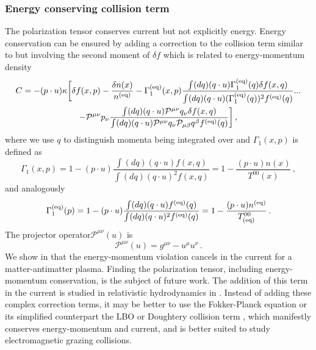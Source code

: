 \subsubsection{Energy conserving collision term}
The polarization tensor  conserves current but not explicitly energy. Energy conservation can be ensured by adding a correction to the collision term similar to  but involving the second moment of $\delta f$ which is related to energy-momentum density \cite{Rocha:2021zcw}
\begin{multline}
    C = - (p\cdot u) \kappa\bigg[\delta f(x,p) -\frac{\delta n(x) }{ n^{(\mathrm{eq})} } -\Gamma_1^{(\mathrm{eq})}(x,p)\frac{\int (dq) (q\cdot u)\Gamma_1^{(\mathrm{eq})}(q) \delta f(x,q) }{\int (dq) (q\cdot u) (\Gamma_1^{(\mathrm{eq})}(q))^2 f^{(\mathrm{eq})}(q) }...\\
    -\mathcal{P}^{\mu \nu}p_\nu\frac{\int (dq) (q\cdot u)\mathcal{P}^{\mu \nu}q_\nu \delta f(x,q) }{\int (dq) (q\cdot u) \mathcal{P}^{\mu \nu}q_\nu\mathcal{P}_{\mu \beta}q^\beta f^{(\mathrm{eq})}(q) }
    \bigg]\,,
\end{multline}
where we use $q$ to distinguish momenta being integrated over and $\Gamma_1(x,p)$ is defined as
\begin{equation}
    \Gamma_1(x,p) = 1-(p\cdot u)\frac{\int (dq) (q\cdot u)f(x,q)}{\int (dq) (q\cdot u)^2f(x,q)}
    = 1-\frac{ (p\cdot u) n(x)}{T^{00}(x)}\,,
\end{equation}
and analogously
\begin{equation}
    \Gamma_1^{(\mathrm{eq})}(p) = 1-(p\cdot u)\frac{\int (dq) (q\cdot u)f^{(\mathrm{eq})}(q)}{\int (dq) (q\cdot u)^2f^{(\mathrm{eq})}(q)}
    = 1-\frac{ (p\cdot u) n^{(\mathrm{eq})}}{T_{(\text{eq})}^{00}} \,.
\end{equation}
The projector operator$\mathcal{P}^{\mu \nu}(u)$ is 
\begin{equation}
    \mathcal{P}^{\mu \nu}(u) = g^{\mu \nu} -u^\mu u^\nu\,.
\end{equation}
We show in \cite{Grayson:2022asf} that the energy-momentum violation cancels in the current for a matter-antimatter plasma. Finding the polarization tensor, including energy-momentum conservation, is the subject of future work. The addition of this term in the current is studied in relativistic hydrodynamics in \cite{Singha:2023eia}. Instead of adding these complex correction terms, it may be better to use the Fokker-Planck equation or its simplified counterpart the LBO or Doughtery collision term \cite{Dougherty1964,Francisquez:2022imd,Ong:1970evs}, which manifestly conserves energy-momentum and current, and is better suited to study electromagnetic grazing collisions. 

